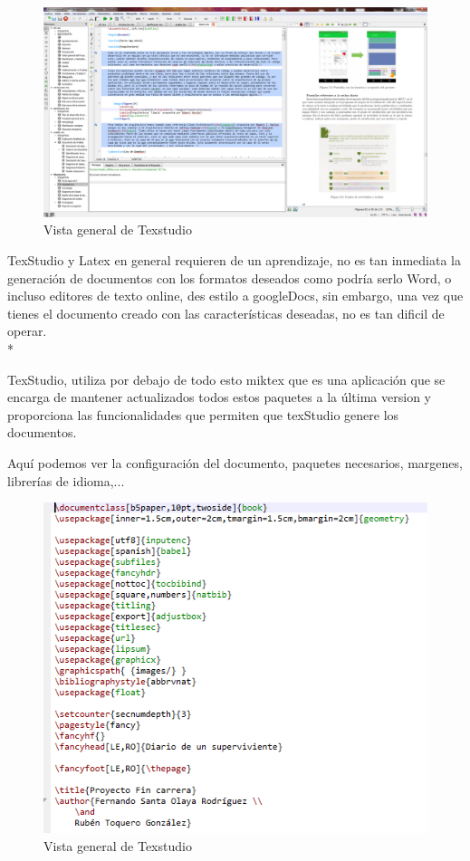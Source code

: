 \documentclass[../pfc.tex]{subfiles}
\begin{document}
	\begin{figure}[H]
		\centering
		\includegraphics[width=1\linewidth]{../images/texstructura}
		\caption{Vista general de Texstudio}
		\label{fig:texstudio}
	\end{figure}
	
	TexStudio y Latex en general requieren de un aprendizaje, no es tan inmediata la generación de documentos con los formatos deseados como podría serlo Word, o incluso editores de texto online, des estilo a googleDocs, sin embargo, una vez que tienes el documento creado con las características deseadas, no es tan dificil de operar.\\*
	
	\clearpage

	TexStudio, utiliza por debajo de todo esto miktex que es una aplicación que se encarga de mantener actualizados todos estos paquetes a la última version y proporciona las funcionalidades que permiten que texStudio genere los documentos.
	
	Aquí podemos ver la configuración del documento, paquetes necesarios, margenes, librerías de idioma,...
	


	\begin{figure}[H]
		\centering
		\includegraphics[width=0.7\linewidth]{../images/texstudiopack}
		\caption{Vista general de Texstudio}
		\label{fig:texstudioPaQ}
	\end{figure}
	
\end{document}
